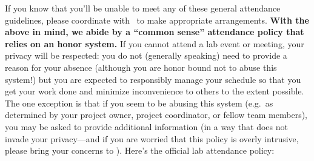 \documentclass{tufte-book} %
\begin{document}
 If you know that you'll be unable to meet any of these general
 attendance guidelines, please coordinate with \director~to make
 appropriate arrangements.  \textbf{With the above in mind, we abide
   by a ``common sense'' attendance policy that relies on an honor
   system.}  If you
 cannot attend a lab event or meeting, your privacy will be respected:
 you do not (generally speaking) need to provide a reason for your
 absence (although you are honor bound not to abuse this system!) but
 you are expected to responsibly manage your schedule so that you get
 your work done and minimize inconvenience to others to the extent
 possible.  The one exception is that if you seem to be abusing this
 system (e.g.\ as determined by your project owner, project
 coordinator, or fellow team members), you may be asked to provide
 additional information (in a way that does not invade your
 privacy---and if you are worried that this policy is overly
 intrusive, please bring your concerns to \director).  Here's the
 official lab attendance policy:
\end{document}

